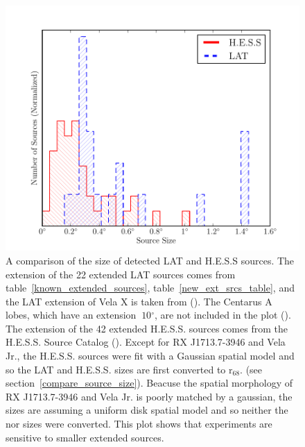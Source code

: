 \documentclass[12pt,preprint]{aastex}
\newcommand{\gev}{\text{GeV}\xspace}
\newcommand{\tev}{\text{TeV}\xspace}
\newcommand{\rsixeight}{{\ensuremath{\text{r}_{68}}}\xspace}
\renewcommand{\deg}{\ensuremath{^\circ}\xspace}
\begin{document}
\clearpage
\begin{figure}
  \begin{center}
    \includegraphics{summary_plots/gev_vs_tev_histogram.pdf}
    \end{center}
    \caption{
    A comparison of the size of detected LAT and H.E.S.S sources.
    The extension of the 22 extended LAT sources comes from
    table~\ref{known_extended_sources}, table~\ref{new_ext_srcs_table},
    and the LAT extension of Vela X is taken from (\cite{velax}). The
    Centarus A lobes, which have an extension $~10\deg$, are not
    included in the plot (\cite{cen_a_lat}).  The \tev extension of
    the 42 extended H.E.S.S. sources comes from the H.E.S.S. Source
    Catalog (\cite{hesscat}).  Except for RX J1713.7-3946 and Vela Jr.,
    the H.E.S.S. sources were fit with a Gaussian spatial model and
    so the LAT and H.E.S.S. sizes are first converted to \rsixeight.
    (see section~\ref{compare_source_size}). Beacuse the spatial
    morphology of RX J1713.7-3946 and Vela Jr. is poorly matched by a
    gaussian, the \tev sizes are assuming a uniform disk spatial model
    and so neither the \gev nor \tev sizes were converted.  This plot
    shows that \tev experiments are sensitive to smaller extended sources.
    }\label{gev_vs_tev_histogram}
  \end{figure}
\end{document}
